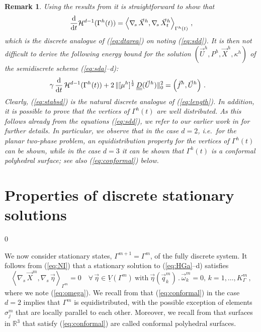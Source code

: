 \documentclass[a4paper,12pt,onecolumn]{article}
\newtheorem{rem}[thm]{Remark}
\newcommand{\R}{{\mathbb R}}
\newcommand{\Vh}{\underline{V}(\Gamma^m)}
\newcommand{\nabs}{\nabla_{\!s}}
\newcommand{\ddt}{\frac{\rm d}{{\rm d}t}}
\newcommand{\mat}[1]{\underline{\underline{#1}}\rule{0pt}{0pt}}
\begin{document}
\begin{rem}
Using the results from \cite{gflows3d} it is straightforward to show that
\begin{equation*}
\ddt \mathcal{H}^{d-1}(\Gamma^h(t)) =  
\left\langle \nabs\,\vec{X}^h, \nabs\,\vec{X}^h_t \right\rangle_{\Gamma^h(t)} 
\,,
\end{equation*}
which is the discrete analogue of {\rm (\ref{eq:dtarea})} on noting 
{\rm (\ref{eq:sdd})}.
It is then not difficult to derive the following
energy bound for the solution $(\vec U^h, P^h, \vec{X}^h, \kappa^h)$ of the
semidiscrete scheme {\rm (\ref{eq:sda}--d)}{\rm :}
\begin{align}
& \gamma\,\ddt\,\mathcal{H}^{d-1}(\Gamma^h(t)) 
+ 2\,\|[\mu^h]^\frac12\,\mat D(\vec U^h)\|^2_{0}
= \left(\vec f^h, \vec U^h\right) \,.
\label{eq:stabsd}
\end{align}
Clearly, {\rm (\ref{eq:stabsd})} is the natural discrete analogue of
{\rm (\ref{eq:length})}.
In addition, it is possible to prove that the vertices of $\Gamma^h(t)$ are
well distributed. As this follows already from the equations 
{\rm (\ref{eq:sdd})}, we
refer to our earlier work in \cite{triplej,gflows3d} for further details. In
particular, we observe that in the case $d=2$, i.e.\ for the planar two-phase
problem, an equidistribution property for the vertices of $\Gamma^h(t)$ can be
shown, while in the case $d=3$ it can be shown that $\Gamma^h(t)$ is a 
conformal polyhedral surface; see also {\rm (\ref{eq:conformal})} below.
\end{rem}

\section{Properties of discrete stationary solutions} \label{sec:discrete_solution_properties}
\setcounter{equation} 0

We now consider stationary states, $\Gamma^{m+1} = \Gamma^m$, of the fully discrete system. It follows from {\rm (\ref{eq:NI})} that a stationary solution to {\rm (\ref{eq:HGa}--d)} satisfies
\begin{equation}\label{eq:conformal}
\left\langle \nabs\, \vec X^m,\nabs\,\vec\eta\right\rangle_{\Gamma^m}=0 \quad \forall \,\vec\eta\in \Vh \ \text{with}\ \vec\eta(\vec{q}_k^m)\,.\,\vec\omega_k^{m} = 0,\, k = 1 ,\ldots, K^m_\Gamma \,,
\end{equation}
where we note {\rm (\ref{eq:omega})}. We recall from \cite{triplej} that (\ref{eq:conformal}) in the case $d=2$ implies that $\Gamma^m$ is
equidistributed, with the possible exception of elements $\sigma^m_j$ that are locally parallel to each other. Moreover, we recall from \cite{gflows3d} that surfaces in $\R^3$ that satisfy (\ref{eq:conformal}) are called conformal polyhedral surfaces.
\newline
\end{document}
